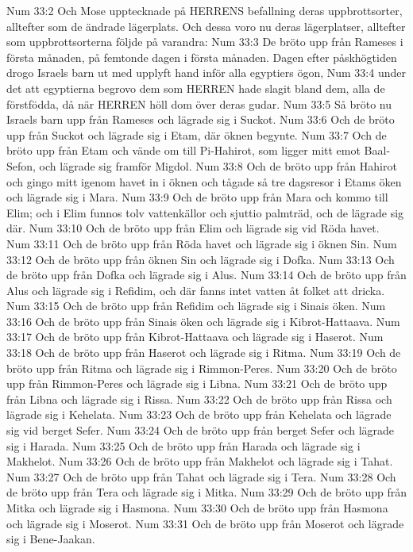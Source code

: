 Num 33:2  Och Mose upptecknade på HERRENS befallning deras uppbrottsorter, alltefter som de ändrade lägerplats. Och dessa voro nu deras lägerplatser, alltefter som uppbrottsorterna följde på varandra:
Num 33:3  De bröto upp från Rameses i första månaden, på femtonde dagen i första månaden. Dagen efter påskhögtiden drogo Israels barn ut med upplyft hand inför alla egyptiers ögon,
Num 33:4  under det att egyptierna begrovo dem som HERREN hade slagit bland dem, alla de förstfödda, då när HERREN höll dom över deras gudar.
Num 33:5  Så bröto nu Israels barn upp från Rameses och lägrade sig i Suckot.
Num 33:6  Och de bröto upp från Suckot och lägrade sig i Etam, där öknen begynte.
Num 33:7  Och de bröto upp från Etam och vände om till Pi-Hahirot, som ligger mitt emot Baal-Sefon, och lägrade sig framför Migdol.
Num 33:8  Och de bröto upp från Hahirot och gingo mitt igenom havet in i öknen och tågade så tre dagsresor i Etams öken och lägrade sig i Mara.
Num 33:9  Och de bröto upp från Mara och kommo till Elim; och i Elim funnos tolv vattenkällor och sjuttio palmträd, och de lägrade sig där.
Num 33:10  Och de bröto upp från Elim och lägrade sig vid Röda havet.
Num 33:11  Och de bröto upp från Röda havet och lägrade sig i öknen Sin.
Num 33:12  Och de bröto upp från öknen Sin och lägrade sig i Dofka.
Num 33:13  Och de bröto upp från Dofka och lägrade sig i Alus.
Num 33:14  Och de bröto upp från Alus och lägrade sig i Refidim, och där fanns intet vatten åt folket att dricka.
Num 33:15  Och de bröto upp från Refidim och lägrade sig i Sinais öken.
Num 33:16  Och de bröto upp från Sinais öken och lägrade sig i Kibrot-Hattaava.
Num 33:17  Och de bröto upp från Kibrot-Hattaava och lägrade sig i Haserot.
Num 33:18  Och de bröto upp från Haserot och lägrade sig i Ritma.
Num 33:19  Och de bröto upp från Ritma och lägrade sig i Rimmon-Peres.
Num 33:20  Och de bröto upp från Rimmon-Peres och lägrade sig i Libna.
Num 33:21  Och de bröto upp från Libna och lägrade sig i Rissa.
Num 33:22  Och de bröto upp från Rissa och lägrade sig i Kehelata.
Num 33:23  Och de bröto upp från Kehelata och lägrade sig vid berget Sefer.
Num 33:24  Och de bröto upp från berget Sefer och lägrade sig i Harada.
Num 33:25  Och de bröto upp från Harada och lägrade sig i Makhelot.
Num 33:26  Och de bröto upp från Makhelot och lägrade sig i Tahat.
Num 33:27  Och de bröto upp från Tahat och lägrade sig i Tera.
Num 33:28  Och de bröto upp från Tera och lägrade sig i Mitka.
Num 33:29  Och de bröto upp från Mitka och lägrade sig i Hasmona.
Num 33:30  Och de bröto upp från Hasmona och lägrade sig i Moserot.
Num 33:31  Och de bröto upp från Moserot och lägrade sig i Bene-Jaakan.
